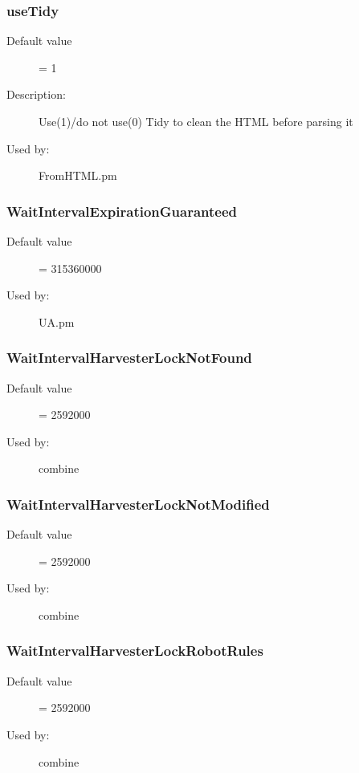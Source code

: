 \subsubsection{useTidy}
\label{useTidy}
\begin{description}
\item[Default value] = 1
\item[Description:] Use(1)/do not use(0) Tidy to clean the HTML before parsing it
\item[Used by:] FromHTML.pm
\end{description}
\subsubsection{WaitIntervalExpirationGuaranteed}
\label{WaitIntervalExpirationGuaranteed}
\begin{description}
\item[Default value] = 315360000
\item[Used by:] UA.pm
\end{description}
\subsubsection{WaitIntervalHarvesterLockNotFound}
\label{WaitIntervalHarvesterLockNotFound}
\begin{description}
\item[Default value] = 2592000
\item[Used by:] combine
\end{description}
\subsubsection{WaitIntervalHarvesterLockNotModified}
\label{WaitIntervalHarvesterLockNotModified}
\begin{description}
\item[Default value] = 2592000
\item[Used by:] combine
\end{description}
\subsubsection{WaitIntervalHarvesterLockRobotRules}
\label{WaitIntervalHarvesterLockRobotRules}
\begin{description}
\item[Default value] = 2592000
\item[Used by:] combine
\end{description}
